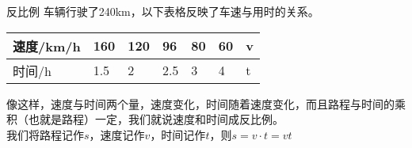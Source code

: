 \documentclass[aspectratio=169]{ctexbeamer} %
\begin{document}
\begin{frame}[t]{反比例}
车辆行驶了240km，以下表格反映了车速与用时的关系。
\begin{center}
\begin{tabular}{| l | l | l | l | l | l | l |}
    \hline
    速度/km/h & 160 & 120 & 96 & 80 & 60 & v \\
    \hline
    时间/h & 1.5 & 2 & 2.5 & 3 & 4 & t \\
    \hline
\end{tabular} 
\end{center}
像这样，速度与时间两个量，速度变化，时间随着速度变化，而且路程与时间的乘积（也就是路程）一定，我们就说速度和时间成\alert{反比例}。\\
我们将路程记作$s$，速度记作$v$，时间记作$t$，则$s = v \cdot t = vt$
\begin{columns}


\end{columns}
\end{frame}
\end{document}
